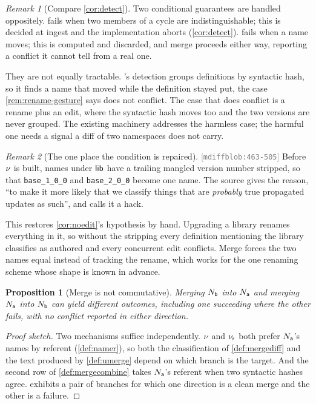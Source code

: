 \documentclass[11pt]{article}
\theoremstyle{definition}
\theoremstyle{plain}
\newtheorem{proposition}{Proposition}[section]
\theoremstyle{remark}
\newtheorem{remark}{Remark}[section]
\newcommand{\src}[1]{{\footnotesize\textcolor{gray}{[\texttt{#1}]}}}
\begin{document}
\begin{remark}[Compare \cref{cor:detect}]\label{rem:two-side-conditions}
Two conditional guarantees are handled oppositely.  fails when two members of a
cycle are indistinguishable; this is decided at ingest and the implementation aborts
(\cref{cor:detect}).  fails when a name moves; this is computed and discarded, and
merge proceeds either way, reporting a conflict it cannot tell from a real one.

They are not equally tractable. 's detection groups definitions by syntactic
hash, so it finds a name that moved while the definition stayed put, the case
\cref{rem:rename-gesture} says does not conflict. The case that does conflict is a rename plus an
edit, where the syntactic hash moves too and the two versions are never grouped. The existing
machinery addresses the harmless case; the harmful one needs a signal a diff of two namespaces does
not carry.
\end{remark}

\begin{remark}[The one place the condition is repaired]\label{rem:libcanon}
\src{mdiffblob:463-505} Before $\nu$ is built, names under $\mathsf{lib}$ have a trailing mangled version
number stripped, so that \texttt{base\_1\_0\_0} and \texttt{base\_2\_0\_0} become one name. The source
gives the reason, ``to make it more likely that we classify things that are \emph{probably} true
propagated updates as such'', and calls it a hack.

This restores \cref{cor:noedit}'s hypothesis by hand. Upgrading a library renames everything in it,
so without the stripping every definition mentioning the library classifies as authored and every
concurrent edit conflicts. Merge forces the two names equal instead of tracking the rename, which
works for the one renaming scheme whose shape is known in advance.
\end{remark}

\begin{proposition}[Merge is not commutative]\label{prop:merge-asym}
Merging $N_{\mathsf{b}}$ into $N_{\mathsf{a}}$ and merging $N_{\mathsf{a}}$ into $N_{\mathsf{b}}$ can yield different outcomes, including one
succeeding where the other fails, with no conflict reported in either direction.
\end{proposition}
\begin{proof}[Proof sketch]
Two mechanisms suffice independently. $\nu$ and $\nu_{\mathsf{r}}$ both prefer $N_{\mathsf{a}}$'s names by referent
(\cref{def:namer}), so both the classification of \cref{def:mergediff} and the text produced by
\cref{def:umerge} depend on which branch is the target. And the second row of
\cref{def:mergecombine} takes $N_{\mathsf{a}}$'s referent when two syntactic hashes agree. 
exhibits a pair of branches for which one direction is a clean merge and the other is a failure.
\end{proof}
\end{document}
